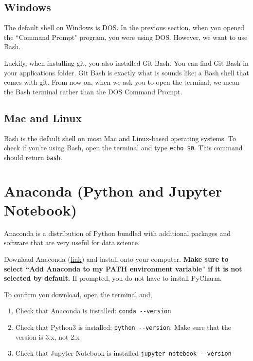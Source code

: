 \documentclass[12pt]{article}
\numberwithin{equation}{section}
\begin{document}
	\subsection{Windows}
	The default shell on Windows is DOS.  In the previous section, when you opened the ``Command Prompt" program, you were using DOS. However, we want to use Bash.
	
	Luckily, when installing git, you also installed Git Bash. You can find Git Bash in your applications folder. Git Bash is exactly what is sounds like: a Bash shell that comes with git. From now on, when we ask you to open the terminal, we mean the Bash terminal rather than the DOS Command Prompt.
	
	\subsection{Mac and Linux}
	Bash is the default shell on most Mac and Linux-based operating systems. To check if you're using Bash, open the terminal and type \verb|echo $0|. This command should return \verb|bash|. 
	
	\section{Anaconda (Python and Jupyter Notebook)}
	
	Anaconda is a distribution of Python bundled with additional packages and software that are very useful for data science. 
	
	Download Anaconda (\hyperref{https://www.anaconda.com/products/individual}{}{}{link}) and install onto your computer.  \textbf{Make sure to select ``Add Anaconda to my PATH environment variable" if it is not selected by default.} If prompted, you do not have to install PyCharm.
	
	To confirm you download, open the terminal and,
	\begin{enumerate}
		\item Check that Anaconda is installed: \verb|conda --version|
		\item Check that Python3 is installed: \verb|python --version|. Make sure that the version is 3.x, not 2.x
		\item Check that Jupyter Notebook is installed \verb|jupyter notebook --version|
	\end{enumerate}
	
\end{document}
